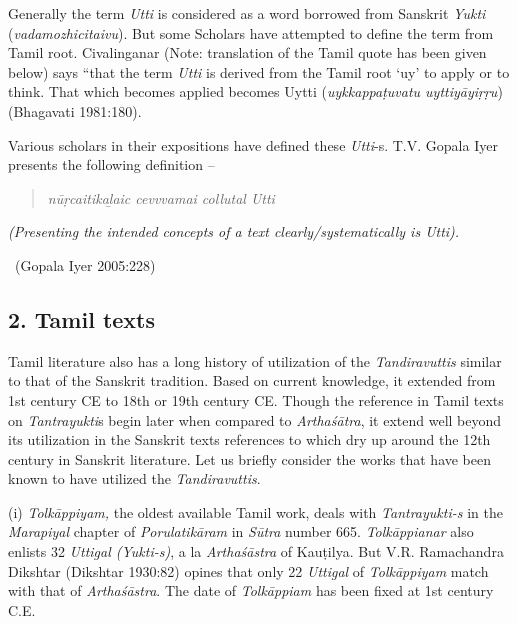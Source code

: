 Generally the term \textit{Utti} is considered as a word borrowed from Sanskrit \textit{Yukti} (\textit{vadamozhicitaivu}). But some Scholars have attempted to define the term from Tamil root. Civalinganar (Note: translation of the Tamil quote has been given below) says “that the term \textit{Utti} is derived from the Tamil root ‘uy’ to apply or to think. That which becomes applied becomes Uytti (\textit{uykkappaṭuvatu uyttiyāyiṛṛu})\hfill (Bhagavati 1981:180).

Various scholars in their expositions have defined these \textit{Utti}-s. T.V. Gopala Iyer presents the following definition –

\begin{verse}
\textit{nūṛcaitikaḻaic cevvvamai collutal Utti}
\end{verse}

\begin{myquote}
\textit{(Presenting the intended concepts of a text clearly/systematically is Utti).}

~\hfill (Gopala Iyer 2005:228)
\end{myquote}


\subsection*{2. Tamil texts}

Tamil literature also has a long history of utilization of the \textit{Tandiravuttis} similar to that of the Sanskrit tradition. Based on current knowledge, it extended from 1st century CE to 18th or 19th century CE. Though the reference in Tamil texts on \textit{Tantrayukti}s begin later when compared to \textit{Arthaśātra}, it extend well beyond its utilization in the Sanskrit texts references to which dry up around the 12th century in Sanskrit literature. Let us briefly consider the works that have been known to have utilized the \textit{Tandiravuttis}.

(i) \textit{Tolkāppiyam,} the oldest available Tamil work, deals with \textit{Tantrayukti-s} in the \textit{Marapiyal} chapter of \textit{Porulatikāram} in \textit{Sūtra} number 665. \textit{Tolkāppianar} also enlists 32 \textit{Uttigal (Yukti-s)}, a la \textit{Arthaśāstra} of Kauṭilya. But V.R. Ramachandra Dikshtar (Dikshtar 1930:82) opines that only 22 \textit{Uttigal} of \textit{Tolkāppiyam} match with that of \textit{Arthaśāstra}. The date of \textit{Tolkāppiam} has been fixed at 1st century C.E.

\newpage

